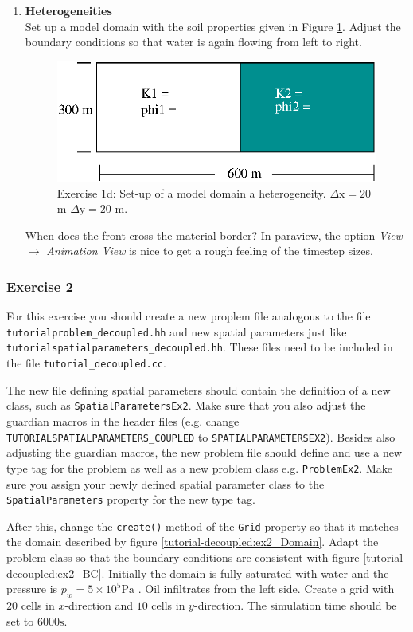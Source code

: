 \begin{enumerate}
\item \textbf{Heterogeneities}  \\
Set up a model domain with the soil properties given in Figure \ref{tutorial-deoucpled:exercise1_d}. Adjust the boundary conditions so that water is again flowing from left to right.
\begin{figure}[h]
\centering
\includegraphics[width=0.5\linewidth,keepaspectratio]{EPS/exercise1_c.eps}
\caption{Exercise 1d: Set-up of a model domain a heterogeneity. $\Delta \text{x} = 20$ m $\Delta \text{y} = 20$ m.}\label{tutorial-deoucpled:exercise1_d}
\end{figure}
When does the front cross the material border? In paraview, the option \textit{View} $\rightarrow$ \textit{Animation View} is nice to get a rough feeling of the timestep sizes.
\end{enumerate}

\subsubsection{Exercise 2}
For this exercise you should create a new proplem file analogous to
the file \texttt{tutorialproblem\_decoupled.hh} and new spatial parameters 
just like \texttt{tutorialspatialparameters\_decoupled.hh}. These files need to
be included in the file \texttt{tutorial\_decoupled.cc}. 

The new file defining spatial parameters should contain the definition 
of a new class, such as \texttt{SpatialParametersEx2}. Make sure that you also adjust the guardian
macros in the header files (e.g. change \texttt{TUTORIALSPATIALPARAMETERS\_COUPLED} to
\texttt{SPATIALPARAMETERSEX2}). Besides also adjusting the guardian macros, 
the new problem file should define and use a new type tag for the problem as well as a new problem class
e.g. \texttt{ProblemEx2}. Make sure you assign your newly defined spatial 
parameter class to the \texttt{SpatialParameters} property for the new 
type tag. 

After this, change the \texttt{create()} method of the \texttt{Grid}
property so that it matches the domain described
by figure \ref{tutorial-decoupled:ex2_Domain}. Adapt the problem class
so that the boundary conditions are consistent with figure
\ref{tutorial-decoupled:ex2_BC}. Initially the domain is fully saturated
with water and the pressure is $p_w = 5 \times 10^5 \text{Pa}$ . Oil
infiltrates from the left side. Create a grid with $20$ cells in
$x$-direction and $10$ cells in $y$-direction. The simulation time
should be set to $6000 \text{s}$.

